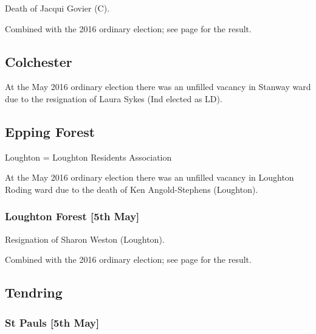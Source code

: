 \documentclass[a4paper,openany]{book}
\begin{document}
\begin{resultsiii}
Death of Jacqui Govier (C).

Combined with the 2016 ordinary election; see page \pageref{StGeorgesCastlePoint} for the result.

\subsection*{Colchester}

At the May 2016 ordinary election there was an unfilled vacancy in Stanway ward due to the resignation of Laura Sykes (Ind elected as LD).

\subsection*{Epping Forest}

Loughton = Loughton Residents Association

At the May 2016 ordinary election there was an unfilled vacancy in Loughton Roding ward due to the death of Ken Angold-Stephens (Loughton).

\subsubsection*{Loughton Forest \hspace*{\fill}\nolinebreak[1]%
\enspace\hspace*{\fill}
[5th May]}


Resignation of Sharon Weston (Loughton).

Combined with the 2016 ordinary election; see page \pageref{LoughtonForestEppingForest} for the result.

\subsection*{Tendring}

\subsubsection*{St Pauls \hspace*{\fill}\nolinebreak[1]%
\enspace\hspace*{\fill}
[5th May]}


\end{resultsiii}
\end{document}
